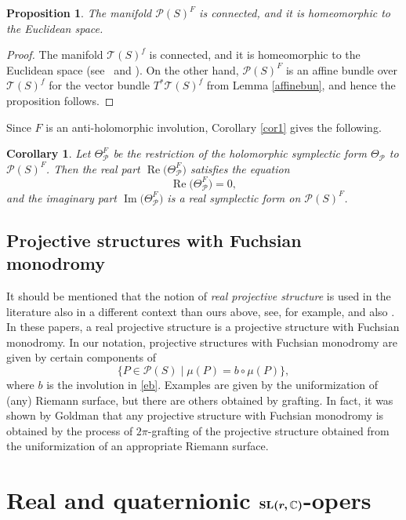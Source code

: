 \documentclass[pdftex]{sigma}
\numberwithin{equation}{section}
\newtheorem{Corollary}[Theorem]{Corollary}
\newtheorem{Proposition}[Theorem]{Proposition}
 { \theoremstyle{definition}
\newtheorem{Definition}[Theorem]{Definition}
\newtheorem{Note}[Theorem]{Note}
\newtheorem{Example}[Theorem]{Example}
\newtheorem{Remark}[Theorem]{Remark} }
\begin{document}
\begin{Proposition}\label{prop1}
The manifold ${\mathcal P}(S)^F$ is connected, and it is homeomorphic to the Euclidean space.
\end{Proposition}

\begin{proof}
The manifold ${\mathcal T}(S)^f$ is connected, and it is homeomorphic to the Euclidean space
(see~\cite[p.~122]{Ea} and \cite{Kr}). On the other hand, ${\mathcal P}(S)^F$ is an affine bundle over
${\mathcal T}(S)^f$ for the vector bundle $T^*{\mathcal T}(S)^f$ from Lemma \ref{affinebun}, and hence
the proposition follows.
\end{proof}

Since $F$ is an anti-holomorphic involution, Corollary \ref{cor1} gives the following.

\begin{Corollary}\label{cor2}
Let $\Theta^F_{\mathcal P}$ be the restriction of the holomorphic symplectic form $\Theta_{\mathcal P}$ to
${\mathcal P}(S)^F$. Then the real part $\operatorname{Re}\bigl(\Theta^F_{\mathcal P}\bigr)$ satisfies the equation
\[
\operatorname{Re}\bigl(\Theta^F_{\mathcal P}\bigr) = 0,
\]
and the imaginary part $\operatorname{Im}\bigl(\Theta^F_{\mathcal P}\bigr)$ is a real symplectic form on ${\mathcal P}(S)^F$.
\end{Corollary}

\subsection{Projective structures with Fuchsian monodromy}

It should be mentioned that the notion of {\em real projective structure} is used in the literature also in a
different context than ours above, see, for example, \cite{Fa} and also \cite{Hel, Tak,Te}. In these papers, a real projective structure
is a projective structure with Fuchsian monodromy.
In our notation, projective structures with Fuchsian monodromy are given by certain components of
\[\{P\in\mathcal P(S) \mid \mu(P) = b\circ\mu(P)\},\]
where $b$ is the involution in \eqref{eb}.
Examples are given by the uniformization of (any) Riemann surface, but there are others obtained by grafting. In fact, it was shown by Goldman \cite{Go2} that any projective structure with Fuchsian monodromy is obtained by the process of $2\pi$-grafting of the projective structure obtained from
the uniformization of an appropriate Riemann surface.

\section[Real and quaternionic SL(r,C)-opers]{Real and quaternionic $\boldsymbol{{\rm SL}(r,\mathbb{C})}$-opers}\label{realoper}
\end{document}
